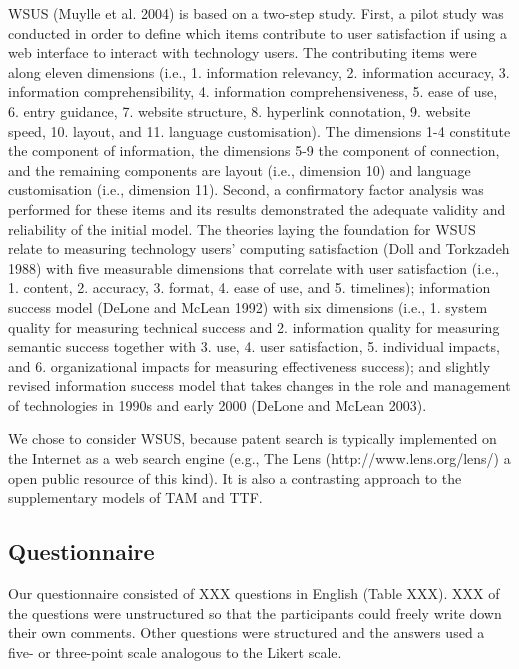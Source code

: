 \documentclass[11pt]{article}
\begin{document}
WSUS (Muylle et al. 2004) is based on a two-step study. First, a pilot study was conducted in order to define which items contribute to user satisfaction if using a web interface to interact with technology users. The contributing items were along eleven dimensions (i.e., 1. information relevancy, 2. information accuracy, 3. information comprehensibility, 4. information comprehensiveness, 5. ease of use, 6. entry guidance, 7. website structure, 8. hyperlink connotation, 9. website speed, 10. layout, and 11. language customisation). The dimensions 1-4 constitute the component of information, the dimensions 5-9 the component of connection, and the remaining components are layout (i.e., dimension 10) and language customisation (i.e., dimension 11). Second, a confirmatory factor analysis was performed for these items and its results demonstrated the adequate validity and reliability of the initial model. The theories laying the foundation for WSUS relate to measuring technology users’ computing satisfaction (Doll and Torkzadeh 1988) with five measurable dimensions that correlate with user satisfaction (i.e., 1. content, 2. accuracy, 3. format, 4. ease of use, and 5. timelines); information success model (DeLone and McLean 1992) with six dimensions (i.e., 1. system quality for measuring technical success and 2. information quality for measuring semantic success together with 3. use, 4. user satisfaction, 5. individual impacts, and 6. organizational impacts for measuring effectiveness success); and slightly revised information success model  that takes changes in the role and management of technologies in 1990s and early 2000 (DeLone and McLean 2003). 

We chose to consider WSUS, because patent search is typically implemented on the Internet as a web search engine (e.g., The Lens (http://www.lens.org/lens/) a open public resource of this kind). It is also a contrasting approach to the supplementary models of TAM and TTF.


\subsection{Questionnaire}
\label{questionnaire}

Our questionnaire consisted of XXX questions in English (Table XXX). XXX of the questions were unstructured so that the participants could freely write down their own comments. Other questions were structured and the answers used a five- or three-point scale analogous to the Likert scale.
\end{document}
